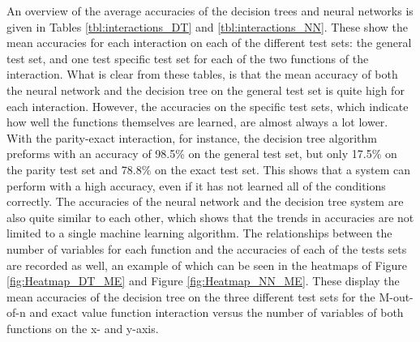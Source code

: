 \documentclass[letterpaper]{article} %
\begin{document}
\begin{table}[b!]
\centering
\caption{The mean accuracies of the neural network on each test set after training on each interaction. }
\label{tbl:interactions_NN}
\end{table}

An overview of the average accuracies of the decision trees and neural networks is given in Tables \ref{tbl:interactions_DT} and \ref{tbl:interactions_NN}. These show the mean accuracies for each interaction on each of the different test sets: the general test set, and one test specific test set for each of the two functions of the interaction. What is clear from these tables, is that the mean accuracy of both the neural network and the decision tree on the general test set is quite high for each interaction. However, the accuracies on the specific test sets, which indicate how well the functions themselves are learned, are almost always a lot lower. With the parity-exact interaction, for instance, the decision tree algorithm preforms with an accuracy of 98.5\% on the general test set, but only 17.5\% on the parity test set and 78.8\% on the exact test set. This shows that a system can perform with a high accuracy, even if it has not learned all of the conditions correctly. The accuracies of the neural network and the decision tree system are also quite similar to each other, which shows that the trends in accuracies are not limited to a single machine learning algorithm. The relationships between the number of variables for each function and the accuracies of each of the tests sets are recorded as well, an example of which can be seen in the heatmaps of Figure \ref{fig:Heatmap_DT_ME} and Figure \ref{fig:Heatmap_NN_ME}. These display the mean accuracies of the decision tree on the three different test sets for the M-out-of-n and exact value function interaction versus the number of variables of both functions on the x- and y-axis.
\end{document}
